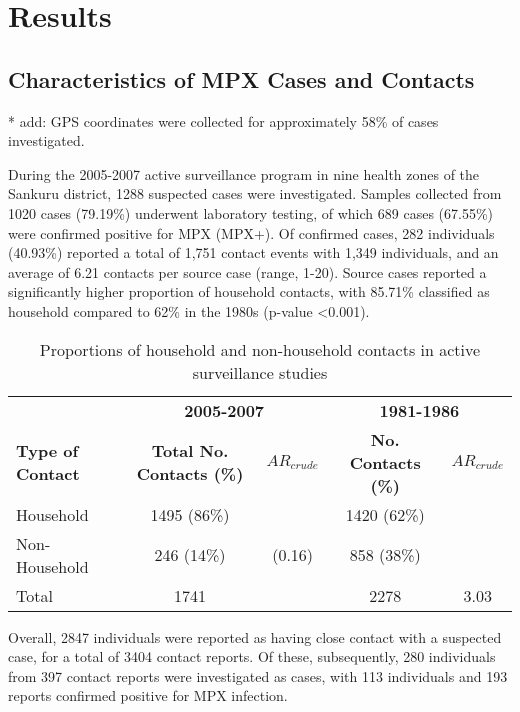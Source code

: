 \section{Results}

\subsection{Characteristics of MPX Cases and Contacts}

* add: GPS coordinates were collected for approximately 58\% of cases investigated. 

During the 2005-2007 active surveillance program in nine health zones of the Sankuru district, 1288 suspected cases were investigated. Samples collected from 1020 cases (79.19\%) underwent laboratory testing, of which 689 cases (67.55\%) were confirmed positive for MPX (MPX+). Of confirmed cases, 282 individuals (40.93\%) reported a total of 1,751 contact events with 1,349 individuals, and an average of 6.21 contacts per source case (range, 1-20). Source cases reported a significantly higher proportion of household contacts, with 85.71\% classified as household compared to 62\% in the 1980s (p-value \textless 0.001).


\begin{table}
\centering
\caption{Proportions of household and non-household contacts in active surveillance studies}
\begin{tabular}{lcccc} 
\toprule
& \multicolumn{2}{c}{\textbf{2005-2007}} & \multicolumn{2}{c}{\textbf{1981-1986}} \\
\cmidrule(l){2-3} \cmidrule(l){4-5} 
\textbf{Type of Contact}  &	\textbf{Total No. Contacts (\%)} &  $AR_{crude}$ &	\textbf{ No. Contacts (\%)} & $AR_{crude}$ \\
\midrule
Household  & 1495 (86\%) & ~ & 1420 (62\%) & ~\\
Non-Household  & 246 (14\%) &	(0.16) & 858 (38\%) & ~ \\
\midrule
Total &	1741 & ~ & 2278 & 3.03 \\
\bottomrule
\end{tabular}
\end{table}

Overall, 2847 individuals were reported as having close contact with a suspected case, for a total of 3404 contact reports. Of these, subsequently, 280 individuals from 397 contact reports were investigated as cases, with 113 individuals and 193 reports confirmed positive for MPX infection. 




